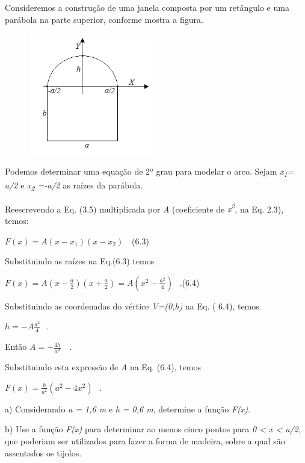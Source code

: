 Consideremos a construção de uma janela composta por um retângulo e uma parábola na parte superior, conforme mostra a figura.

\begin{figure}[H]
	\begin{Center}
		\includegraphics[width=2.16in,height=2.09in]{capitulos/funcao_do_segundo_grau/media/image21.png}
	\end{Center}
\end{figure}

Podemos determinar uma equação de 2º grau para modelar o arco. Sejam \textit{x\textsubscript{1}= a/2} e \textit{x\textsubscript{2  }=-a/2} as raízes da parábola.

Reescrevendo a Eq. (3.5) multiplicada por \textit{A} (coeficiente de \textit{x\textsuperscript{2}}, na Eq. 2.3), temos:

 \( F \left( x \right) =A \left( x-x_{1} \right)  \left( x-x_{2} \right) ~~ ^{}_{~ } \) \tab (6.3)

 Substituindo as raízes na Eq.(6.3) temos

    \( F \left( x \right) =A \left( x-\frac{a}{2} \right)  \left( x+\frac{a}{2} \right) =A \left( x^{2}-\frac{a^{2}}{4} \right) ~ ^{}_{~ } \) .\tab \tab \tab (6.4)

Substituindo as coordenadas do vértice \textit{V=(0,h)}  na Eq. ( 6.4), temos

 \( h=-A\frac{a^{2}}{4}~~ ^{}_{~ } \).

Então \( A=-\frac{4h}{a^{2}}~~ ^{}_{~ } \) .

Substituindo esta expressão de \textit{A} na Eq. (6.4), temos

 \( F \left( x \right) =\frac{h}{a^{2}} \left( a^{2}-4x^{2} \right) ~ ^{}_{~ } \) .

	a) Considerando \textit{a = 1,6 m} e \textit{h  = 0,6 m}, determine a função \textit{F(x)}.

	b) Use a função \textit{F(x)} para determinar ao menos cinco pontos para \textit{0 < x < a/2}, que poderiam ser utilizados para fazer a forma de madeira, sobre a qual são assentados os tijolos.

